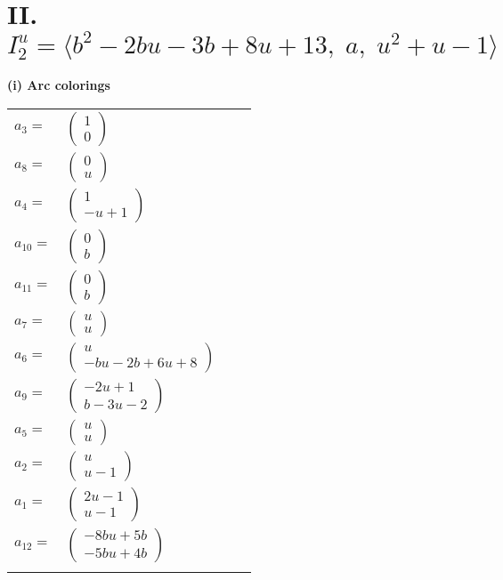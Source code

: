 \documentclass[1p]{elsarticle_modified}
\theoremstyle{definition}
\begin{document}
\centering \section*{II. $I^u_{2}= \langle b^2-2 b u-3 b+8 u+13,\;a,\;u^2+u-1 \rangle$}
\flushleft \textbf{(i) Arc colorings}\\
\begin{tabular}{m{7pt} m{180pt} m{7pt} m{180pt} }
\flushright $a_{3}=$&$\begin{pmatrix}1\\0\end{pmatrix}$ \\
\flushright $a_{8}=$&$\begin{pmatrix}0\\u\end{pmatrix}$ \\
\flushright $a_{4}=$&$\begin{pmatrix}1\\- u+1\end{pmatrix}$ \\
\flushright $a_{10}=$&$\begin{pmatrix}0\\b\end{pmatrix}$ \\
\flushright $a_{11}=$&$\begin{pmatrix}0\\b\end{pmatrix}$ \\
\flushright $a_{7}=$&$\begin{pmatrix}u\\u\end{pmatrix}$ \\
\flushright $a_{6}=$&$\begin{pmatrix}u\\- b u-2 b+6 u+8\end{pmatrix}$ \\
\flushright $a_{9}=$&$\begin{pmatrix}-2 u+1\\b-3 u-2\end{pmatrix}$ \\
\flushright $a_{5}=$&$\begin{pmatrix}u\\u\end{pmatrix}$ \\
\flushright $a_{2}=$&$\begin{pmatrix}u\\u-1\end{pmatrix}$ \\
\flushright $a_{1}=$&$\begin{pmatrix}2 u-1\\u-1\end{pmatrix}$ \\
\flushright $a_{12}=$&$\begin{pmatrix}-8 b u+5 b\\-5 b u+4 b\end{pmatrix}$\\&\end{tabular}
\end{document}
